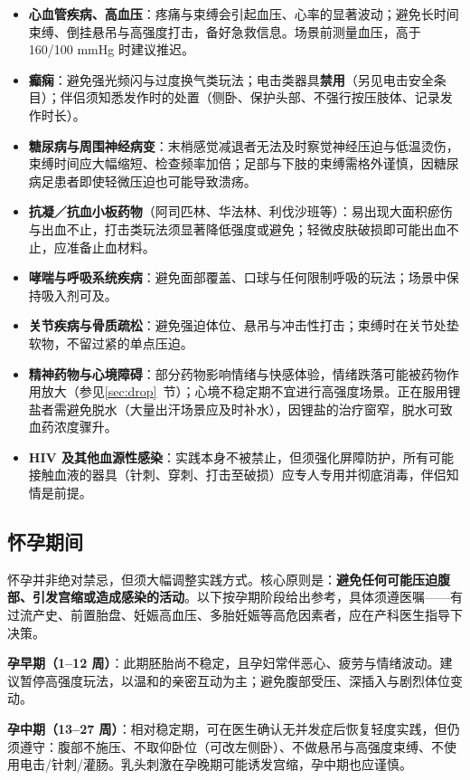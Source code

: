 \documentclass[12pt,UTF8]{ctexbook}
\begin{document}
\begin{itemize}
\item \textbf{心血管疾病、高血压}：疼痛与束缚会引起血压、心率的显著波动；避免长时间束缚、倒挂悬吊与高强度打击，备好急救信息。场景前测量血压，高于 160/100 mmHg 时建议推迟。
\item \textbf{癫痫}：避免强光频闪与过度换气类玩法；电击类器具\textbf{禁用}（另见电击安全条目）；伴侣须知悉发作时的处置（侧卧、保护头部、不强行按压肢体、记录发作时长）。
\item \textbf{糖尿病与周围神经病变}：末梢感觉减退者无法及时察觉神经压迫与低温烫伤，束缚时间应大幅缩短、检查频率加倍；足部与下肢的束缚需格外谨慎，因糖尿病足患者即使轻微压迫也可能导致溃疡。
\item \textbf{抗凝／抗血小板药物}（阿司匹林、华法林、利伐沙班等）：易出现大面积瘀伤与出血不止，打击类玩法须显著降低强度或避免；轻微皮肤破损即可能出血不止，应准备止血材料。
\item \textbf{哮喘与呼吸系统疾病}：避免面部覆盖、口球与任何限制呼吸的玩法；场景中保持吸入剂可及。
\item \textbf{关节疾病与骨质疏松}：避免强迫体位、悬吊与冲击性打击；束缚时在关节处垫软物，不留过紧的单点压迫。
\item \textbf{精神药物与心境障碍}：部分药物影响情绪与快感体验，情绪跌落可能被药物作用放大（参见\ref{sec:drop}~节）；心境不稳定期不宜进行高强度场景。正在服用锂盐者需避免脱水（大量出汗场景应及时补水），因锂盐的治疗窗窄，脱水可致血药浓度骤升。
\item \textbf{HIV 及其他血源性感染}：实践本身不被禁止，但须强化屏障防护，所有可能接触血液的器具（针刺、穿刺、打击至破损）应专人专用并彻底消毒，伴侣知情是前提。
\end{itemize}

\subsection{怀孕期间}

怀孕并非绝对禁忌，但须大幅调整实践方式。核心原则是：\textbf{避免任何可能压迫腹部、引发宫缩或造成感染的活动}。以下按孕期阶段给出参考，具体须遵医嘱——有过流产史、前置胎盘、妊娠高血压、多胎妊娠等高危因素者，应在产科医生指导下决策。

\textbf{孕早期（1--12 周）}：此期胚胎尚不稳定，且孕妇常伴恶心、疲劳与情绪波动。建议暂停高强度玩法，以温和的亲密互动为主；避免腹部受压、深插入与剧烈体位变动。

\textbf{孕中期（13--27 周）}：相对稳定期，可在医生确认无并发症后恢复轻度实践，但仍须遵守：腹部不施压、不取仰卧位（可改左侧卧）、不做悬吊与高强度束缚、不使用电击/针刺/灌肠。乳头刺激在孕晚期可能诱发宫缩，孕中期也应谨慎。
\end{document}
